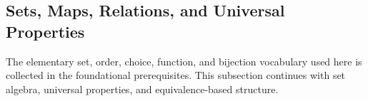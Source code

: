 \subsection{Sets, Maps, Relations, and Universal Properties}

The elementary set, order, choice, function, and bijection vocabulary used here is collected in the foundational prerequisites. This subsection continues with set algebra, universal properties, and equivalence-based structure.
